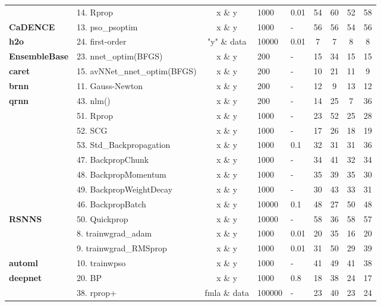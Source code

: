 \begin{Schunk}
\begin{table}[!h]
\begin{tabular}[t]{>{}llcllcccc}
 & 14. Rprop & x \& y & 1000 & 0.01 & 54 & 60 & 52 & 58\\

\multirow{-3}{*}{\raggedright\arraybackslash \textbf{CaDENCE}} & 13. pso\_psoptim & x \& y & 1000 & - & 56 & 56 & 54 & 56\\
\cmidrule{1-9}
\textbf{h2o} & 24. first-order & "y" \& data & 10000 & 0.01 & 7 & 7 & 8 & 8\\
\cmidrule{1-9}
\textbf{EnsembleBase} & 23. nnet\_optim(BFGS) & x \& y & 200 & - & 15 & 34 & 15 & 15\\
\cmidrule{1-9}
\textbf{caret} & 15. avNNet\_nnet\_optim(BFGS) & x \& y & 200 & - & 10 & 21 & 11 & 9\\
\cmidrule{1-9}
\textbf{brnn} & 11. Gauss-Newton & x \& y & 200 & - & 12 & 9 & 13 & 12\\
\cmidrule{1-9}
\textbf{qrnn} & 43. nlm() & x \& y & 200 & - & 14 & 25 & 7 & 36\\
\cmidrule{1-9}
 & 51. Rprop & x \& y & 1000 & - & 23 & 52 & 25 & 28\\

 & 52. SCG & x \& y & 1000 & - & 17 & 26 & 18 & 19\\

 & 53. Std\_Backpropagation & x \& y & 1000 & 0.1 & 32 & 31 & 31 & 36\\

 & 47. BackpropChunk & x \& y & 1000 & - & 34 & 41 & 32 & 34\\

 & 48. BackpropMomentum & x \& y & 1000 & - & 35 & 39 & 35 & 30\\

 & 49. BackpropWeightDecay & x \& y & 1000 & - & 30 & 43 & 33 & 31\\

 & 46. BackpropBatch & x \& y & 10000 & 0.1 & 48 & 27 & 50 & 48\\

\multirow{-8}{*}{\raggedright\arraybackslash \textbf{RSNNS}} & 50. Quickprop & x \& y & 10000 & - & 58 & 36 & 58 & 57\\
\cmidrule{1-9}
 & 8. trainwgrad\_adam & x \& y & 1000 & 0.01 & 20 & 35 & 16 & 20\\

 & 9. trainwgrad\_RMSprop & x \& y & 1000 & 0.01 & 31 & 50 & 29 & 39\\

\multirow{-3}{*}{\raggedright\arraybackslash \textbf{automl}} & 10. trainwpso & x \& y & 1000 & - & 41 & 49 & 41 & 38\\
\cmidrule{1-9}
\textbf{deepnet} & 20. BP & x \& y & 1000 & 0.8 & 18 & 38 & 24 & 17\\
\cmidrule{1-9}
 & 38. rprop+ & fmla \& data & 100000 & - & 23 & 40 & 23 & 24\\


\end{tabular}
\end{table}
\end{Schunk}
